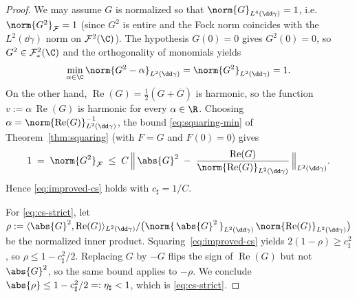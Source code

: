 \begin{proof}
We may assume $G$ is normalized so that $\norm{G}_{L^4(\dd\gamma)} = 1$,
i.e.\ $\norm{G^2}_{\mathcal{F}} = 1$ (since $G^2$ is entire and the Fock
norm coincides with the $L^2(\dd\gamma)$ norm on $\mathcal{F}^2(\C)$).
The hypothesis $G(0)=0$ gives $G^2(0)=0$, so $G^2 \in
\mathcal{F}^2_\ast(\C)$ and the orthogonality of monomials yields
\begin{equation}\label{eq:F2-norm-1}
\min_{\alpha \in \C} \norm{G^2 - \alpha}_{L^2(\dd\gamma)}
= \norm{G^2}_{L^2(\dd\gamma)}
= 1.
\end{equation}
On the other hand, $\operatorname{Re}(G) =
\tfrac{1}{2}(G + \overline{G})$ is harmonic, so the function
$v := \alpha\, \operatorname{Re}(G)$ is harmonic for every $\alpha \in \R$.
Choosing
$\alpha = \norm{\operatorname{Re}(G)}_{L^2(\dd\gamma)}^{-1}$, the bound
\eqref{eq:squaring-min} of Theorem~\ref{thm:squaring} (with
$F = G$ and $F(0) = 0$) gives
\[
1
\;=\; \norm{G^2}_{\mathcal{F}}
\;\le\; C\,\Bigl\|\, \abs{G}^2
\;-\; \frac{\operatorname{Re}(G)}{\norm{\operatorname{Re}(G)}_{L^2(\dd\gamma)}}\,
\Bigr\|_{L^2(\dd\gamma)}.
\]
Hence \eqref{eq:improved-cs} holds with $c_\sharp = 1/C$.

\medskip

For \eqref{eq:cs-strict}, let
$\rho := \langle \abs{G}^2, \operatorname{Re}(G)\rangle_{L^2(\dd\gamma)} /
\bigl(\norm{\,\abs{G}^2\,}_{L^2(\dd\gamma)}\,
\norm{\operatorname{Re}(G)}_{L^2(\dd\gamma)}\bigr)$ be the normalized
inner product. Squaring~\eqref{eq:improved-cs} yields
$2(1 - \rho) \ge c_\sharp^2$, so $\rho \le 1 - c_\sharp^2/2$. Replacing
$G$ by $-G$ flips the sign of $\operatorname{Re}(G)$ but not $\abs{G}^2$,
so the same bound applies to $-\rho$. We conclude
$\abs{\rho} \le 1 - c_\sharp^2/2 =: \eta_\sharp < 1$, which is
\eqref{eq:cs-strict}.
\end{proof}

